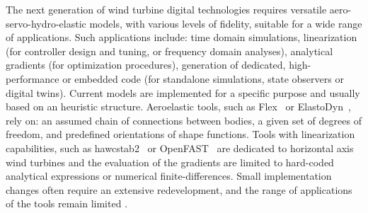 \documentclass[wes, manuscript]{copernicus}
\renewcommand{\v}[1]{\boldsymbol{#1}}
\begin{document}


\introduction 

The next generation of wind turbine digital technologies requires versatile aero-servo-hydro-elastic
models, with various levels of fidelity, suitable for a wide range of applications. 
Such applications include: time domain simulations, linearization (for controller design and tuning, or frequency domain analyses), analytical gradients (for optimization procedures), generation of dedicated, high-performance or embedded code (for standalone simulations, state observers or digital twins). 
Current models are implemented for a specific purpose and usually based on an heuristic structure.
Aeroelastic tools, such as Flex~\citep{flexoye,branlard:2019flex} or ElastoDyn~\citep{openfast}, rely on: an assumed chain of connections between bodies, a given set of degrees of freedom, and predefined orientations of shape functions. Tools with linearization capabilities, such as hawcstab2~\citep{Sonderby:2014} or OpenFAST~\citep{openfast} are dedicated to horizontal axis wind turbines and the evaluation of the gradients are limited to hard-coded analytical expressions or numerical finite-differences. 
Small implementation changes often require an extensive redevelopment, and the range of applications of the tools remain limited \citep{Simani:2015}.
\end{document}
